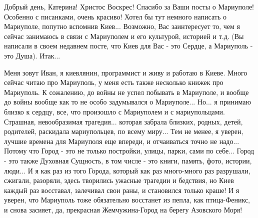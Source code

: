  
 
 
 
 

Добрый день, Катерина! Христос Воскрес! Спасибо за Ваши посты о Мариуполе!
Особенно с писанками, очень красиво! Хотел бы тут немного написать о Мариуполе, попутно вспомнив Киев...
Возможно, Вас заинтересует то, чем я сейчас занимаюсь в связи с Мариуполем и его культурой, историей и т.д.
(Вы написали в своем недавнем посте, что Киев для Вас - это Сердце,
а Мариуполь - это Душа). Итак...

Меня зовут Иван, я киевлянин, программист и живу и работаю в Киеве. Много
сейчас читаю про Мариуполь, у меня есть также несколько книжек про Мариуполь.
К сожалению, до войны не успел побывать в Мариуполе, и вообще до войны вообще
как то не особо задумывался о  Мариуполе...  Но... я принимаю близко к сердцу,
все, что произошло с Мариуполем и с мариупольцами. Страшная, невообразимая
трагедия...  которая забрала близких, родных, детей, родителей, раскидала
мариупольцев, по всему миру... Тем не менее, я уверен, лучшие времена для
Мариуполя еще впереди, и отчаиваться точно не надо... Потому что Город - это не
только постройки, улицы, парки, сами по себе... Город - это также Духовная
Сущность, в том числе - это книги, память, фото, истории, люди...  И я как раз
из того Города, который как раз много-много раз разрушали, сжигали, разоряли,
здесь творились ужасные трагедии и бедствия, но Киев каждый раз восставал,
залечивал свои раны, и становился только краше! И я уверен, что Мариуполь тоже
обязательно восстанет из пепла, как птица-Феникс, и снова засияет, да,
прекрасная Жемчужина-Город на берегу Азовского Моря!

